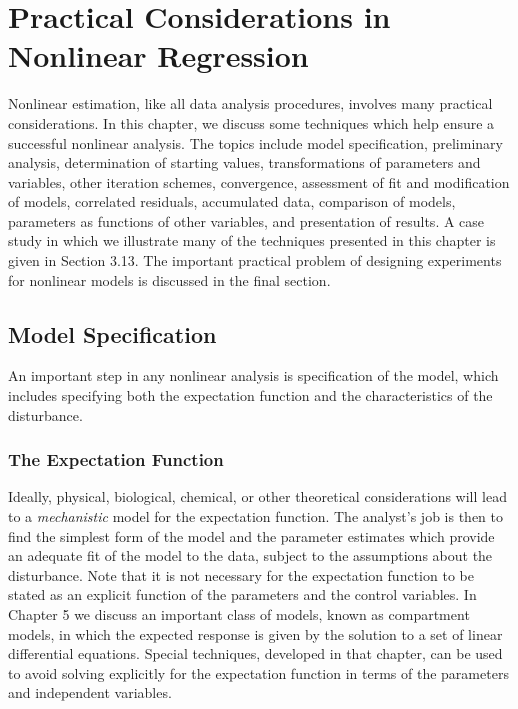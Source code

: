\chapter[Practical Considerations]{Practical Considerations in
Nonlinear Regression}


Nonlinear estimation, like all data analysis procedures, involves
many practical considerations.
In this chapter, we discuss some
techniques which help ensure a successful nonlinear analysis.
The topics include model specification,
preliminary analysis,
determination of starting values,
transformations of parameters and variables,
other iteration schemes,
convergence,
assessment of fit and modification of models,
correlated residuals,
accumulated data,
comparison of models,
parameters as functions of other variables,
and
presentation of results.
A case study in which we illustrate many of the techniques presented
in this chapter is given in Section 3.13.
The important practical problem of designing experiments for nonlinear
models is discussed in the final section.
\section{Model Specification}

An important step in any nonlinear analysis is specification of
the model, which includes specifying both the expectation function and the
characteristics of the disturbance.
\subsection{The Expectation Function}

Ideally, physical, biological, chemical, or other theoretical
considerations will lead to a {\em mechanistic\/} model for the
expectation function.
The analyst's job is then to find the simplest form of the
model and the parameter estimates which provide an adequate fit of
the model to the data, subject to the assumptions about the
disturbance.
Note that it is not necessary for the expectation function to be
stated as an explicit function of the parameters and the control
variables.
In Chapter 5 we discuss an important class of models, known as
compartment models, in which the expected response is given by
the solution to a set of linear differential equations.
Special techniques, developed in that chapter, can be used to
avoid solving explicitly for the expectation function in terms of
the parameters and independent variables.

